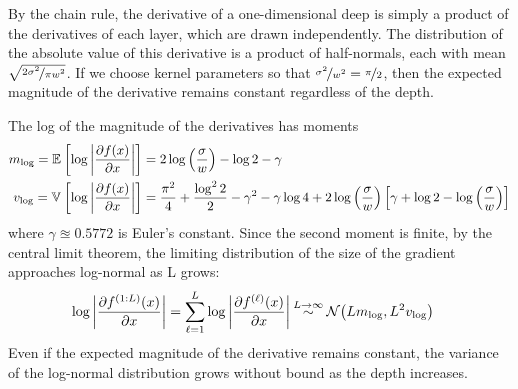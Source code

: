  By the chain rule, the derivative of a one-dimensional deep \gp{} is simply a product of the derivatives of each layer, which are drawn independently.
 The distribution of the absolute value of this derivative is a product of half-normals, each with mean $\sqrt{\nicefrac{2 \sigma^2}{\pi w^2}}$.
%
%
If we choose kernel parameters so that ${\nicefrac{\sigma^2}{w^2} = \nicefrac{\pi}{2}}$, then the expected magnitude of the derivative remains constant regardless of the depth.


The log of the magnitude of the derivatives has moments
\begin{align}
m_{\log} = \mathbb{E}_{} \left[ {\log \left| \frac{\partial f(x)}{\partial x} \right|} \right] & = 2 \log \left( \frac{\sigma}{w} \right) - \log2 - \gamma \nonumber \\
v_{\log} = \mathbb{V}_{} \left[ {\log \left| \frac{\partial f(x)}{\partial x} \right|} \right] & = \frac{\pi^2}{4} + \frac{\log^2 2}{2}  - \gamma^2 - \gamma \log4 + 2 \log\left(\frac{\sigma}{w}\right) \left[ \gamma + \log2 - \log \left(\frac{\sigma}{w}\right) \right]
\end{align}
where $\gamma \approxeq 0.5772$ is Euler's constant.  Since the second moment is finite, by the central limit theorem, the limiting distribution of the size of the gradient approaches log-normal as L grows:
\begin{align}
\log \left| \frac{\partial f^{(1:L)}(x)}{\partial x} \right| 
& = \sum_{\ell=1}^L \log \left| \frac{\partial f^{(\ell)}(x)}{\partial x} \right| 
\mathbin{\overset{L \rightarrow \infty}{\sim}} \mathcal{N}\!\left( L m_{\log} ,L^2 v_{\log}\right)
\end{align}
%
Even if the expected magnitude of the derivative remains constant, the variance of the log-normal distribution grows without bound as the depth increases.

